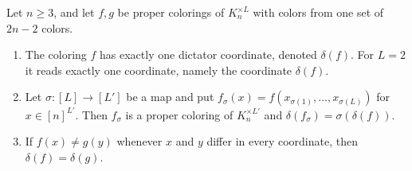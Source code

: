\begin{lemma}\label{lem:dictator}
Let $n\ge3$, and let $f,g$ be proper colorings of $K_n^{\times L}$ with colors from one set of $2n-2$ colors.
\begin{enumerate}
\item[(a)] The coloring $f$ has exactly one dictator coordinate, denoted $\delta(f)$. For $L=2$ it reads exactly one coordinate, namely the coordinate $\delta(f)$.
\item[(b)] Let $\sigma:[L]\to[L']$ be a map and put $f_\sigma(x)=f(x_{\sigma(1)},\ldots,x_{\sigma(L)})$ for $x\in[n]^{L'}$. Then $f_\sigma$ is a proper coloring of $K_n^{\times L'}$ and $\delta(f_\sigma)=\sigma(\delta(f))$.
\item[(c)] If $f(x)\ne g(y)$ whenever $x$ and $y$ differ in every coordinate, then $\delta(f)=\delta(g)$.
\end{enumerate}
\end{lemma}
